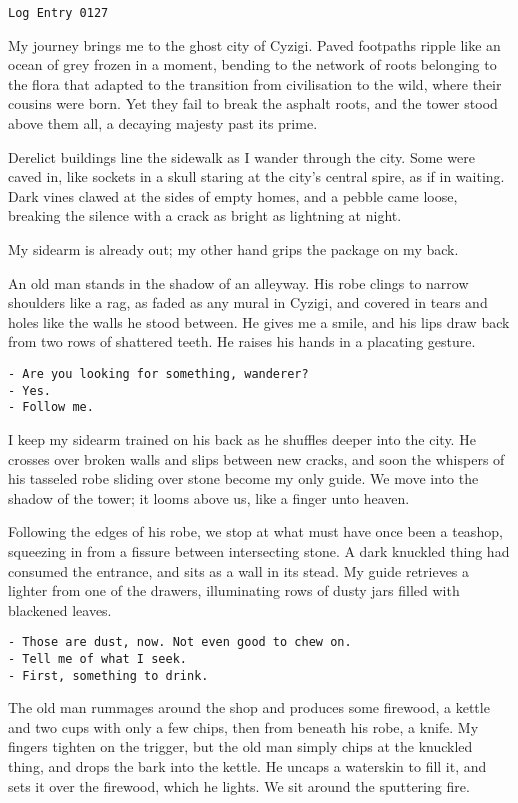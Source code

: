 \begin{center}
    \texttt{Log Entry 0127}
\end{center}

My journey brings me to the ghost city of Cyzigi. Paved footpaths ripple like an ocean of grey frozen in a moment, bending to the network of roots belonging to the flora that adapted to the transition from civilisation to the wild, where their cousins were born. Yet they fail to break the asphalt roots, and the tower stood above them all, a decaying majesty past its prime.

Derelict buildings line the sidewalk as I wander through the city. Some were caved in, like sockets in a skull staring at the city’s central spire, as if in waiting. Dark vines clawed at the sides of empty homes, and a pebble came loose, breaking the silence with a crack as bright as lightning at night.

My sidearm is already out; my other hand grips the package on my back.

An old man stands in the shadow of an alleyway. His robe clings to narrow shoulders like a rag, as faded as any mural in Cyzigi, and covered in tears and holes like the walls he stood between. He gives me a smile, and his lips draw back from two rows of shattered teeth. He raises his hands in a placating gesture.

\texttt{- Are you looking for something, wanderer?\\
- Yes. \\
- Follow me.
}

I keep my sidearm trained on his back as he shuffles deeper into the city. He crosses over broken walls and slips between new cracks, and soon the whispers of his tasseled robe sliding over stone become my only guide. We move into the shadow of the tower; it looms above us, like a finger unto heaven.

Following the edges of his robe, we stop at what must have once been a teashop, squeezing in from a fissure between intersecting stone. A dark knuckled thing had consumed the entrance, and sits as a wall in its stead. My guide retrieves a lighter from one of the drawers, illuminating rows of dusty jars filled with blackened leaves.

\texttt{- Those are dust, now. Not even good to chew on.\\
- Tell me of what I seek.\\
- First, something to drink.
}

The old man rummages around the shop and produces some firewood, a kettle and two cups with only a few chips, then from beneath his robe, a knife. My fingers tighten on the trigger, but the old man simply chips at the knuckled thing, and drops the bark into the kettle. He uncaps a waterskin to fill it, and sets it over the firewood, which he lights. We sit around the sputtering fire.

